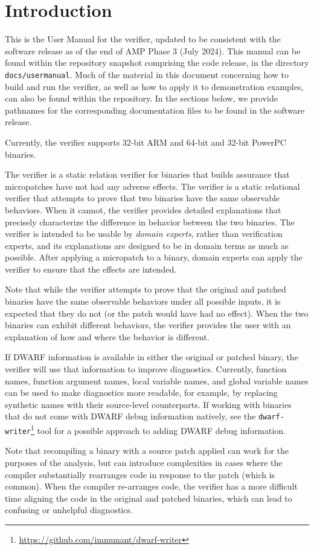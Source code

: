 \section{Introduction}\label{sec:introduction}

This is the User Manual for the \pate{} verifier, updated to be consistent with the software release as of the end of AMP Phase 3 (July 2024).
This manual can be found within the repository snapshot comprising the code release, in the directory \texttt{docs/usermanual}.
Much of the material in this document concerning how to build and run the verifier, as well as how to apply it to demonstration examples, can also be found within the repository.
In the sections below, we provide pathnames for the corresponding documentation files to be found in the software release.

Currently, the verifier supports 32-bit ARM and 64-bit and 32-bit PowerPC binaries.

The \pate{} verifier is a static relation verifier for binaries that builds assurance that micropatches have not had any adverse effects.
The verifier is a static relational verifier that attempts to prove that two binaries have the same observable behaviors.
When it cannot, the verifier provides detailed explanations that precisely characterize the difference in behavior between the two binaries.
The verifier is intended to be usable by \emph{domain experts}, rather than verification experts, and its explanations are designed to be in domain terms as much as possible.
After applying a micropatch to a binary, domain experts can apply the verifier to ensure that the effects are intended.

Note that while the verifier attempts to prove that the original and patched binaries have the same observable behaviors under all possible inputs, it is expected that they do not (or the patch would have had no effect).
When the two binaries can exhibit different behaviors, the verifier provides the user with an explanation of how and where the behavior is different.

If DWARF information is available in either the original or patched binary, the verifier will use that information to improve diagnostics.
Currently, function names, function argument names, local variable names, and global variable names can be used to make diagnostics more readable, for example, by replacing synthetic names with their source-level counterparts.
If working with binaries that do not come with DWARF debug information natively, see the \lstinline{dwarf-writer}\footnote{\url{https://github.com/immunant/dwarf-writer}} tool for a possible approach to adding DWARF debug information.

Note that recompiling a binary with a source patch applied can work for the purposes of the analysis, but can introduce complexities in cases where the compiler substantially rearranges code in response to the patch (which is common).
When the compiler re-arranges code, the verifier has a more difficult time aligning the code in the original and patched binaries, which can lead to confusing or unhelpful diagnostics.
